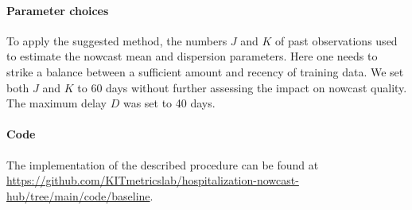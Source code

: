 \documentclass[a4paper, 11pt]{article}\usepackage[]{graphicx}\usepackage[]{color}
\begin{document}
\paragraph{Parameter choices} To apply the suggested method, the numbers $J$ and $K$ of past observations used to estimate the nowcast mean and dispersion parameters. Here one needs to strike a balance between a sufficient amount and recency of training data. We set both $J$ and $K$ to 60 days without further assessing the impact on nowcast quality. The maximum delay $D$ was set to 40 days.

\paragraph{Code} The implementation of the described procedure can be found at \url{https://github.com/KITmetricslab/hospitalization-nowcast-hub/tree/main/code/baseline}.
\end{document}
